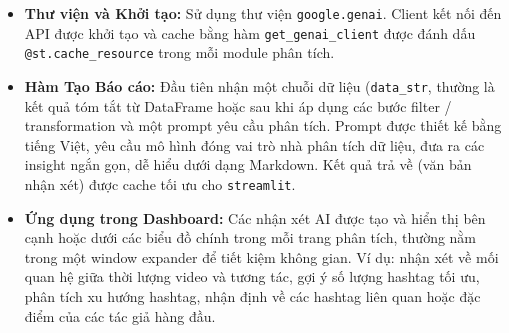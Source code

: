 \begin{itemize}
    \item \textbf{Thư viện và Khởi tạo:} Sử dụng thư viện \texttt{google.genai}. Client kết nối đến API được khởi tạo và cache bằng hàm \texttt{get\_genai\_client} được đánh dấu \texttt{@st.cache\_resource} trong mỗi module phân tích.
    
    \item \textbf{Hàm Tạo Báo cáo:} Đầu tiên nhận một chuỗi dữ liệu (\texttt{data\_str}, thường là kết quả tóm tắt từ DataFrame hoặc sau khi áp dụng các bước filter / transformation và một prompt yêu cầu phân tích. Prompt được thiết kế bằng tiếng Việt, yêu cầu mô hình đóng vai trò nhà phân tích dữ liệu, đưa ra các insight ngắn gọn, dễ hiểu dưới dạng Markdown. Kết quả trả về (văn bản nhận xét) được cache tối ưu cho \texttt{streamlit}.
    
    \item \textbf{Ứng dụng trong Dashboard:} Các nhận xét AI được tạo và hiển thị bên cạnh hoặc dưới các biểu đồ chính trong mỗi trang phân tích, thường nằm trong một window expander để tiết kiệm không gian. Ví dụ: nhận xét về mối quan hệ giữa thời lượng video và tương tác, gợi ý số lượng hashtag tối ưu, phân tích xu hướng hashtag, nhận định về các hashtag liên quan hoặc đặc điểm của các tác giả hàng đầu.
\end{itemize}